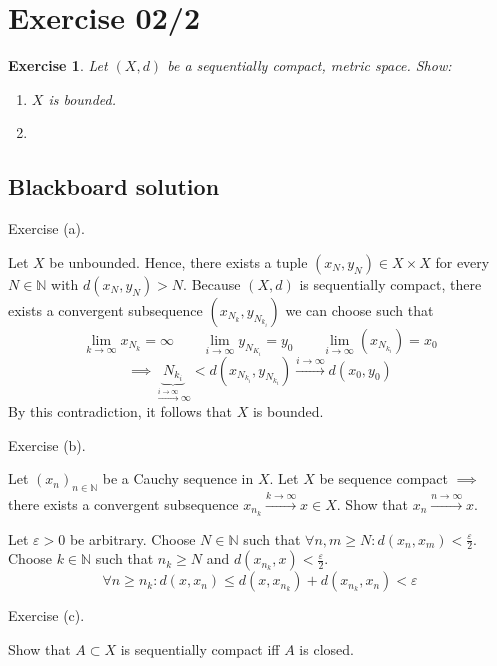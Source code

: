 \documentclass{article}
\newtheorem{ex}{Exercise} %
\begin{document}
\section{Exercise 02/2}

\begin{ex}
  Let $(X, d)$ be a sequentially compact, metric space. Show:
  \begin{enumerate}
    \item[a.] $X$ is bounded.
    \item[b.]
  \end{enumerate}
\end{ex}

\subsection{Blackboard solution}

Exercise (a).

Let $X$ be unbounded. Hence, there exists a tuple $(x_N, y_N) \in X \times X$ for every $N \in \mathbb N$ with $d(x_N, y_N) > N$.
Because $(X, d)$ is sequentially compact, there exists a convergent subsequence $(x_{N_k}, y_{N_{k_i}})$ we can choose such that
\[ \lim_{k\to\infty} x_{N_k} = \infty \qquad \lim_{i\to\infty} y_{N_{K_i}} = y_0 \qquad \lim_{i\to\infty} (x_{N_{k_i}}) = x_0 \]
\[ \implies \underbrace{N_{k_i}}_{\xrightarrow{i\to\infty} \infty} < d(x_{N_{k_i}}, y_{N_{k_i}}) \xrightarrow{i\to\infty} d(x_0, y_0) \]
By this contradiction, it follows that $X$ is bounded.

Exercise (b).

Let $(x_n)_{n\in\mathbb N}$ be a Cauchy sequence in $X$. Let $X$ be sequence compact $\implies$ there exists a convergent subsequence $x_{n_{k}} \xrightarrow{k\to\infty} x \in X$. Show that $x_n \xrightarrow{n\to\infty} x$.

Let $\varepsilon > 0$ be arbitrary. Choose $N \in \mathbb N$ such that $\forall n,m \geq N: d(x_n, x_m) < \frac\varepsilon2$.
Choose $k \in \mathbb N$ such that $n_k \geq N$ and $d(x_{n_k}, x) < \frac\varepsilon2$.
\[ \forall n \geq n_k: d(x, x_n) \leq d(x, x_{n_k}) + d(x_{n_k}, x_n) < \varepsilon \]

Exercise (c).

Show that $A \subset X$ is sequentially compact iff $A$ is closed.
\end{document}

